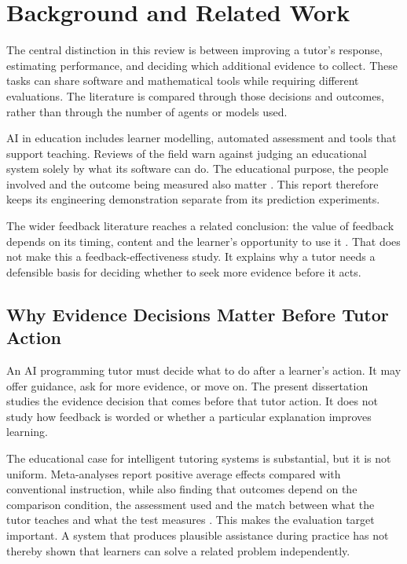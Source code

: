 \chapter{Background and Related Work}
\label{ch:related-work}

The central distinction in this review is between improving a tutor's response, estimating performance, and deciding which
additional evidence to collect. These tasks can share software and mathematical tools while requiring different evaluations.
The literature is compared through those decisions and outcomes, rather than through the number of agents or models used.

AI in education includes learner modelling, automated assessment and tools that support teaching. Reviews of the field warn
against judging an educational system solely by what its software can do. The educational purpose, the people involved and the
outcome being measured also matter \parencite{roll2016evolution,zawackirichter2019ai}. This report therefore keeps its
engineering demonstration separate from its prediction experiments.

The wider feedback literature reaches a related conclusion: the value of feedback depends on its timing, content and the
learner's opportunity to use it \parencite{hattie2007power,shute2008formative}. That does not make this a feedback-effectiveness
study. It explains why a tutor needs a defensible basis for deciding whether to seek more evidence before it acts.

\section{Why Evidence Decisions Matter Before Tutor Action}

An AI programming tutor must decide what to do after a learner's action. It may offer guidance, ask for more evidence, or move
on. The present dissertation studies the evidence decision that comes before that tutor action. It does not study how feedback
is worded or whether a particular explanation improves learning.

The educational case for intelligent tutoring systems is substantial, but it is not uniform. Meta-analyses report positive
average effects compared with conventional instruction, while also finding that outcomes depend on the comparison condition,
the assessment used and the match between what the tutor teaches and what the test measures
\parencite{ma2014intelligent,kulik2016effectiveness,vanlehn2011relative}. This makes the evaluation target important. A
system that produces plausible assistance during practice has not thereby shown that learners can solve a related problem
independently.

